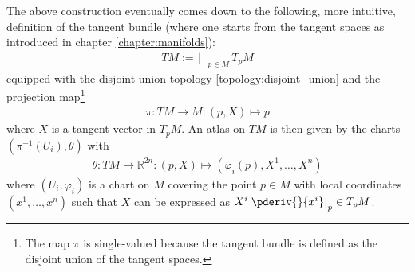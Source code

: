 

    \begin{adefinition}
        The above construction eventually comes down to the following, more intuitive, definition of the tangent bundle (where one starts from the tangent spaces as introduced in chapter \ref{chapter:manifolds}):
        \begin{gather}
            TM := \bigsqcup_{p\in M}T_pM
        \end{gather}
        equipped with the disjoint union topology \ref{topology:disjoint_union} and the projection map\footnote{The map $\pi$ is single-valued because the tangent bundle is defined as the disjoint union of the tangent spaces.}
        \begin{gather}
            \pi:TM\rightarrow M:(p, X)\mapsto p
        \end{gather}
        where $X$ is a tangent vector in $T_pM$. An atlas on $TM$ is then given by the charts $(\pi^{-1}(U_i), \theta)$ with
        \begin{gather}
            \theta:TM\rightarrow\mathbb{R}^{2n}:(p, X)\mapsto(\varphi_i(p),X^1,\ldots,X^n)
        \end{gather}
        where $(U_i, \varphi_i)$ is a chart on $M$ covering the point $p\in M$ with local coordinates $(x^1,\ldots,x^n)$ such that $X$ can be expressed as $X^i\left.\pderiv{}{x^i}\right|_p\in T_pM$.
    \end{adefinition}

